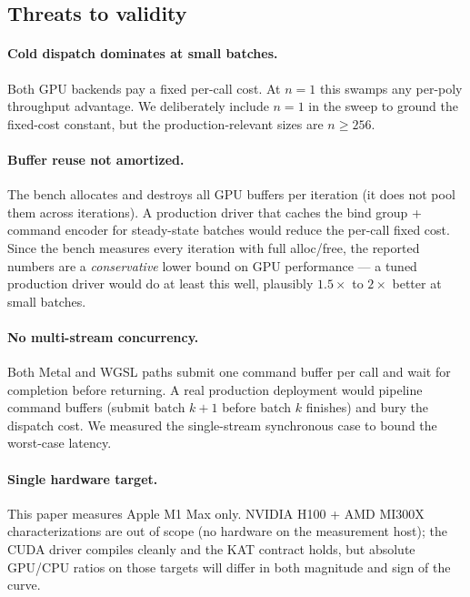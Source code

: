 \subsection{Threats to validity}

\paragraph{Cold dispatch dominates at small batches.}
Both GPU backends pay a fixed per-call cost. At $n=1$ this
swamps any per-poly throughput advantage. We deliberately include
$n=1$ in the sweep to ground the fixed-cost constant, but the
production-relevant sizes are $n \geq 256$.

\paragraph{Buffer reuse not amortized.}
The bench allocates and destroys all GPU buffers per iteration (it
does not pool them across iterations). A production driver that
caches the bind group + command encoder for steady-state batches
would reduce the per-call fixed cost. Since the bench measures every
iteration with full alloc/free, the reported numbers are a
\emph{conservative} lower bound on GPU performance — a tuned
production driver would do at least this well, plausibly $1.5\times$
to $2\times$ better at small batches.

\paragraph{No multi-stream concurrency.}
Both Metal and WGSL paths submit one command buffer per call and
wait for completion before returning. A real production deployment
would pipeline command buffers (submit batch $k+1$ before batch $k$
finishes) and bury the dispatch cost. We measured the single-stream
synchronous case to bound the worst-case latency.

\paragraph{Single hardware target.}
This paper measures Apple M1 Max only. NVIDIA H100 + AMD MI300X
characterizations are out of scope (no hardware on the measurement
host); the CUDA driver compiles cleanly and the KAT contract
holds, but absolute GPU/CPU ratios on those targets will differ
in both magnitude and sign of the curve.
